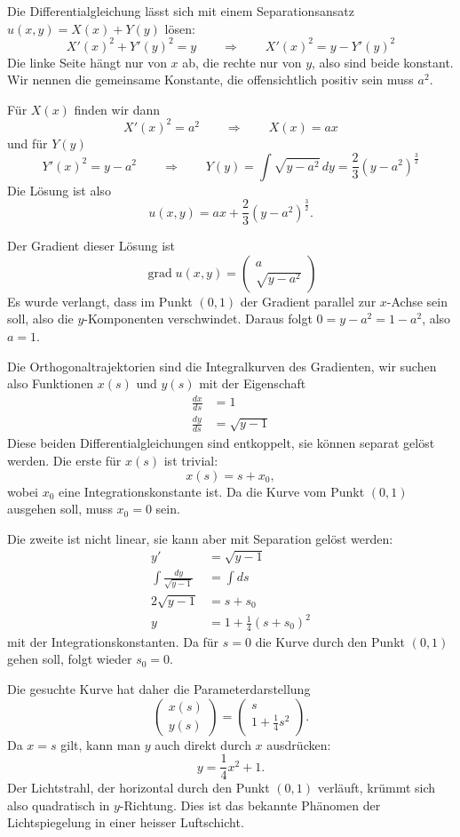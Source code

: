 \begin{loesung}
Die Differentialgleichung  lässt sich mit einem Separationsansatz
$u(x,y)=X(x)+Y(y)$
lösen:
\[
X'(x)^2+Y'(y)^2=y
\qquad
\Rightarrow
\qquad
X'(x)^2=y-Y'(y)^2
\]
Die linke Seite hängt nur von $x$ ab, die rechte nur von $y$, also
sind beide konstant.
Wir nennen die gemeinsame Konstante, die offensichtlich positiv sein
muss $a^2$.

Für $X(x)$ finden wir dann
\[
X'(x)^2=a^2
\qquad\Rightarrow\qquad
X(x)=ax
\]
und für $Y(y)$
\[
Y'(x)^2=y-a^2
\qquad\Rightarrow\qquad
Y(y)=\int \sqrt{y-a^2}\,dy=\frac23(y-a^2)^{\frac32}
\]
Die Lösung ist also
\[
u(x,y)=ax + \frac23(y-a^2)^{\frac32}.
\]

Der Gradient dieser Lösung ist
\[
\operatorname{grad}u(x,y)=\begin{pmatrix}a\\\sqrt{y-a^2}\end{pmatrix}
\]
Es wurde verlangt, dass im Punkt $(0,1)$ der Gradient parallel zur
$x$-Achse sein soll, also die $y$-Komponenten verschwindet. Daraus
folgt $0=y-a^2=1-a^2$, also $a=1$.

Die Orthogonaltrajektorien sind die Integralkurven des Gradienten,
wir suchen also Funktionen $x(s)$ und $y(s)$ mit der Eigenschaft
\begin{align*}
\frac{dx}{ds}&=1\\
\frac{dy}{ds}&=\sqrt{y-1}
\end{align*}
Diese beiden Differentialgleichungen sind entkoppelt, sie können
separat gelöst werden. Die erste für $x(s)$ ist trivial:
\[
x(s)=s + x_0,
\]
wobei $x_0$ eine Integrationskonstante ist.
Da die Kurve vom Punkt $(0,1)$ ausgehen soll, muss $x_0=0$ sein.

Die zweite ist nicht linear, sie kann aber mit Separation gelöst
werden:
\begin{align*}
y'&=\sqrt{y-1}
\\
\int \frac{dy}{\sqrt{y-1}}&=\int ds
\\
2\sqrt{y-1}&=s+s_0
\\
y&=1+\frac14(s+s_0)^2
\end{align*}
mit der Integrationskonstanten.
Da für $s=0$ die Kurve durch den Punkt $(0,1)$ gehen soll, folgt
wieder $s_0=0$.

Die gesuchte Kurve hat daher die Parameterdarstellung
\[
\begin{pmatrix}
x(s)\\y(s)
\end{pmatrix}
=
\begin{pmatrix}
s\\
1+\frac14s^2
\end{pmatrix}.
\]
Da $x=s$ gilt, kann man $y$ auch direkt durch $x$ ausdrücken:
\[
y=\frac14x^2+1.
\]
Der Lichtstrahl, der horizontal durch den Punkt $(0,1)$ verläuft,
krümmt sich also quadratisch in $y$-Richtung.
Dies ist das bekannte Phänomen der Lichtspiegelung in einer
heisser Luftschicht.
\end{loesung}

